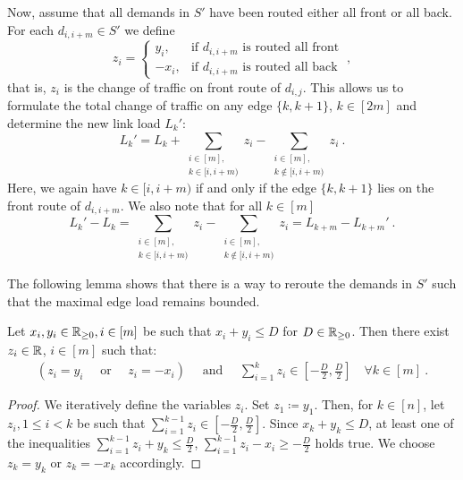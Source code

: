 Now, assume that all demands in $S'$ have been routed either all front or all back.
For each $d_{i, i+m} \in S'$ we define
\begin{equation}
	z_i = \begin{cases}
		y_i, &\text{if } d_{i, i+m} \text{ is routed all front} \\
		-x_i, &\text{if } d_{i, i+m} \text{ is routed all back}
	\end{cases} \ ,
\end{equation}
that is, $z_i$ is the change of traffic on front route of $d_{i, j}$.
This allows us to formulate the total change of traffic on any edge $\{k, k+1\}$, $k \in [2m]$ and determine the new link load $L_k'$:
\begin{equation}
	\label{eq:load-change}
	L_k' = L_k + \sum_{\substack{i \in [m],\\ k \in [i, i+m)}} z_i - \sum_{\substack{i \in [m],\\ k \notin[i, i+m)}} z_i \ .
\end{equation}
Here, we again have $k \in [i, i+m)$ if and only if the edge $\{k,k+1\}$ lies on the front route of $d_{i, i+m}$.
We also note that for all $k \in [m]$
\begin{equation}
	\label{eq:load-increase-equality}
	L_k' - L_k 
	= \sum_{\substack{i \in [m],\\ k \in [i, i+m)}} z_i - \sum_{\substack{i \in [m],\\ k \notin[i, i+m)}} z_i 
	= L_{k + m} - L_{k + m}' \ .
\end{equation}

The following lemma shows that there is a way to reroute the demands in $S'$ such that the maximal edge load remains bounded.
\begin{lemma}
	\label{lemma:reroute-demands}
	Let $x_i, y_i \in \mathbb{R}_{\geq 0}, i \in [m]$ be such that $x_i + y_i \leq D$ for $D \in \mathbb{R}_{\geq 0}$.
	Then there exist $z_i \in \mathbb{R}$, $i \in [m]$ such that:
	\begin{align}
		(z_i = y_i \quad \text{ or } \quad z_i = -x_i) 
		\quad \text{ and } \quad \sum_{i=1}^k z_i \in \left[-\frac{D}{2}, \frac{D}{2}\right] \quad \forall k \in [m] \ .
	\end{align}
\end{lemma}
\begin{proof}
	We iteratively define the variables $z_i$.
	Set $z_1 \coloneqq y_1$.
	Then, for $k \in [n]$, let $z_i, 1 \leq i < k$ be such that $\sum_{i=1}^{k-1} z_i \in \left[-\frac{D}{2}, \frac{D}{2}\right]$.
	Since $x_k + y_k \leq D$, at least one of the inequalities $\sum_{i=1}^{k-1} z_i + y_k \leq \frac{D}{2}$, $\sum_{i=1}^{k-1} z_i - x_i \geq -\frac{D}{2}$ holds true.
	We choose $z_k = y_k$ or $z_k = -x_k$ accordingly.	
\end{proof}

